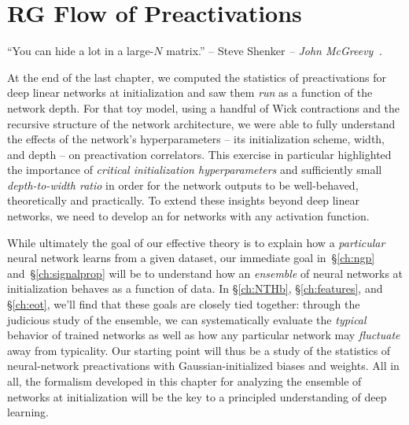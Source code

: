 
\chapter{RG Flow of Preactivations}
\label{ch:ngp}


\epigraph{``You can hide a lot in a large-$N$ matrix.'' -- Steve Shenker \emph{-- John McGreevy~\cite{mcgreevy2010holographic}.} }{}

\noindent{}At the end of the last chapter,
we computed the statistics of preactivations for deep linear networks at initialization
and saw them \emph{run} as a function of the network depth. For that toy model, using a handful of
Wick contractions
and the recursive structure of the network architecture, we were able to fully understand the effects of the network's hyperparameters -- its initialization scheme, width, and depth -- on preactivation correlators. This exercise in particular highlighted the importance of \emph{critical initialization hyperparameters} and sufficiently small \emph{depth-to-width ratio}
in order for the network outputs to be well-behaved, theoretically and practically. 
To extend these insights beyond deep linear networks, we need to develop an  for networks with any activation function.

While ultimately the goal of our effective theory is to explain how a \emph{particular} neural network learns from a given dataset, our immediate goal in~\S\ref{ch:ngp} and~\S\ref{ch:signalprop}
will be to understand how an \emph{ensemble} of neural networks at initialization behaves as a function of data.
In
\S\ref{ch:NTHb}, \S\ref{ch:features}, and \S\ref{ch:eot},
we'll find that these goals are closely tied together:
through the judicious study of the ensemble,
we can systematically evaluate the \emph{typical} behavior of trained
networks
as well as
how any particular network may \emph{fluctuate} away from typicality.
Our starting point will thus be a study of the statistics of neural-network preactivations with Gaussian-initialized biases and weights. 
All in all, the formalism developed in this chapter for analyzing the ensemble of networks at initialization will be the key to a principled understanding of deep learning.

